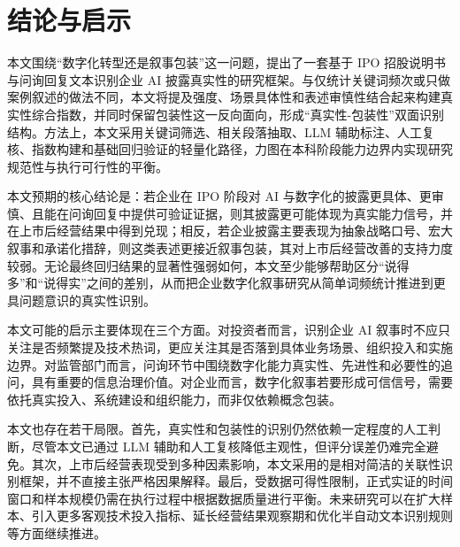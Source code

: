 \section{结论与启示}

本文围绕“数字化转型还是叙事包装”这一问题，提出了一套基于 IPO 招股说明书与问询回复文本识别企业 AI 披露真实性的研究框架。与仅统计关键词频次或只做案例叙述的做法不同，本文将提及强度、场景具体性和表述审慎性结合起来构建真实性综合指数，并同时保留包装性这一反向面向，形成“真实性-包装性”双面识别结构。方法上，本文采用关键词筛选、相关段落抽取、LLM 辅助标注、人工复核、指数构建和基础回归验证的轻量化路径，力图在本科阶段能力边界内实现研究规范性与执行可行性的平衡。

本文预期的核心结论是：若企业在 IPO 阶段对 AI 与数字化的披露更具体、更审慎、且能在问询回复中提供可验证证据，则其披露更可能体现为真实能力信号，并在上市后经营结果中得到兑现；相反，若企业披露主要表现为抽象战略口号、宏大叙事和承诺化措辞，则这类表述更接近叙事包装，其对上市后经营改善的支持力度较弱。无论最终回归结果的显著性强弱如何，本文至少能够帮助区分“说得多”和“说得实”之间的差别，从而把企业数字化叙事研究从简单词频统计推进到更具问题意识的真实性识别。

本文可能的启示主要体现在三个方面。对投资者而言，识别企业 AI 叙事时不应只关注是否频繁提及技术热词，更应关注其是否落到具体业务场景、组织投入和实施边界。对监管部门而言，问询环节中围绕数字化能力真实性、先进性和必要性的追问，具有重要的信息治理价值。对企业而言，数字化叙事若要形成可信信号，需要依托真实投入、系统建设和组织能力，而非仅依赖概念包装。

本文也存在若干局限。首先，真实性和包装性的识别仍然依赖一定程度的人工判断，尽管本文已通过 LLM 辅助和人工复核降低主观性，但评分误差仍难完全避免。其次，上市后经营表现受到多种因素影响，本文采用的是相对简洁的关联性识别框架，并不直接主张严格因果解释。最后，受数据可得性限制，正式实证的时间窗口和样本规模仍需在执行过程中根据数据质量进行平衡。未来研究可以在扩大样本、引入更多客观技术投入指标、延长经营结果观察期和优化半自动文本识别规则等方面继续推进。
